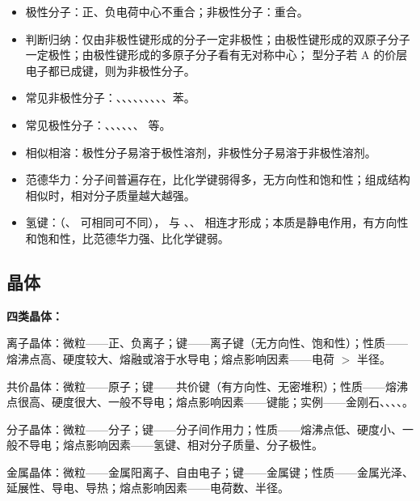             \begin{itemize}
                \item 极性分子：正、负电荷中心不重合；非极性分子：重合。
                \item 判断归纳：仅由非极性键形成的分子一定非极性；由极性键形成的双原子分子一定极性；由极性键形成的多原子分子看有无对称中心； 型分子若 A 的价层电子都已成键，则为非极性分子。
                \item 常见非极性分子：、、、、、、、、、苯。
                \item 常见极性分子：、、、、、、 等。
                \item 相似相溶：极性分子易溶于极性溶剂，非极性分子易溶于非极性溶剂。
                \item 范德华力：分子间普遍存在，比化学键弱得多，无方向性和饱和性；组成结构相似时，相对分子质量越大越强。
                \item 氢键：（、 可相同可不同）， 与 、、 相连才形成；本质是静电作用，有方向性和饱和性，比范德华力强、比化学键弱。
            \end{itemize}

        \subsection{晶体}

            \par\vspace{0.6em}
            \begin{minipage}[t]{0.47\textwidth}
                \textbf{四类晶体：}
                \begin{datas}[leftmargin=*]
                    \item 离子晶体：微粒——正、负离子；键——离子键（无方向性、饱和性）；性质——熔沸点高、硬度较大、熔融或溶于水导电；熔点影响因素——电荷 \(>\) 半径。
                    \item 共价晶体：微粒——原子；键——共价键（有方向性、无密堆积）；性质——熔沸点很高、硬度很大、一般不导电；熔点影响因素——键能；实例——金刚石、、、、。
                \end{datas}
            \end{minipage}
            \hfill
            \begin{minipage}[t]{0.47\textwidth}
                \begin{datas}[leftmargin=*]
                    \item 分子晶体：微粒——分子；键——分子间作用力；性质——熔沸点低、硬度小、一般不导电；熔点影响因素——氢键、相对分子质量、分子极性。
                    \item 金属晶体：微粒——金属阳离子、自由电子；键——金属键；性质——金属光泽、延展性、导电、导热；熔点影响因素——电荷数、半径。
                \end{datas}
            \end{minipage}
            \par\vspace{0.6em}

